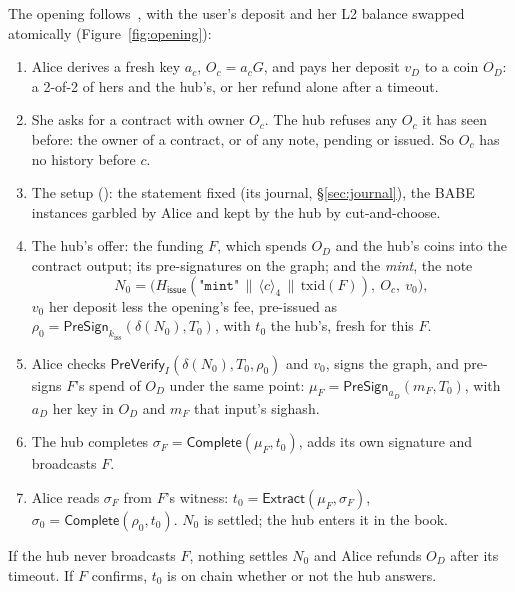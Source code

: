 \documentclass[11pt]{article}
\theoremstyle{plain}
\theoremstyle{definition}
\newcommand{\cat}{\,\|\,}
\newcommand{\be}[2]{\langle #1\rangle_{#2}}          %
\newcommand{\Ht}[1]{H_{\textsf{#1}}}                 %
\newcommand{\PSign}{\mathsf{PreSign}}
\newcommand{\PVfy}{\mathsf{PreVerify}}
\newcommand{\Compl}{\mathsf{Complete}}
\newcommand{\Extr}{\mathsf{Extract}}
\newcommand{\kiss}{k_{\mathrm{iss}}}
\newcommand{\Oc}{O_c}
\begin{document}
The opening follows~\cite{lichen}, with the user's deposit and her L2
balance swapped atomically (Figure~\ref{fig:opening}):
\begin{enumerate}[nosep]
\item Alice derives a fresh key $a_c$, $\Oc = a_cG$, and pays her
  deposit $v_D$ to a coin $O_D$: a 2-of-2 of hers and the hub's, or her
  refund alone after a timeout.
\item She asks for a contract with owner $\Oc$. The hub refuses any
  $\Oc$ it has seen before: the owner of a contract, or of any note,
  pending or issued. So $\Oc$ has no history before $c$.
\item The setup (\cite{lichen}): the statement fixed (its journal,
  \S\ref{sec:journal}), the BABE instances garbled by Alice and kept by
  the hub by cut-and-choose.
\item The hub's offer: the funding $F$, which spends $O_D$ and the hub's
  coins into the contract output; its pre-signatures on the graph; and
  the \emph{mint}, the note
  \[
    N_0 = \big(\Ht{issue}(\texttt{"mint"} \cat \be{c}{4} \cat
    \mathrm{txid}(F)),\ \Oc,\ v_0\big),
  \]
  $v_0$ her deposit less the opening's fee, pre-issued as $\rho_0 =
  \PSign_{\kiss}(\delta(N_0), T_0)$, with $t_0$ the hub's, fresh for
  this $F$.
\item Alice checks $\PVfy_I(\delta(N_0), T_0, \rho_0)$ and $v_0$, signs
  the graph, and pre-signs $F$'s spend of $O_D$ under the same point:
  $\mu_F = \PSign_{a_D}(m_F, T_0)$, with $a_D$ her key in $O_D$ and $m_F$
  that input's sighash.
\item The hub completes $\sigma_F = \Compl(\mu_F, t_0)$, adds its own
  signature and broadcasts $F$.
\item Alice reads $\sigma_F$ from $F$'s witness: $t_0 = \Extr(\mu_F,
  \sigma_F)$, $\sigma_0 = \Compl(\rho_0, t_0)$. $N_0$ is settled; the
  hub enters it in the book.
\end{enumerate}
If the hub never broadcasts $F$, nothing settles $N_0$ and Alice
refunds $O_D$ after its timeout. If $F$ confirms, $t_0$ is on chain
whether or not the hub answers.
\end{document}
